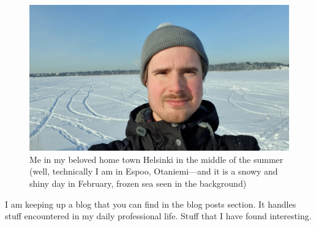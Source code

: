 \documentclass{article}
\begin{document}




        

        \begin{figure}
          \includegraphics[width=\linewidth]{me1.jpg}
          \caption{Me in my beloved home town Helsinki in the middle of the summer (well, technically I am in Espoo, Otaniemi---and it is a snowy and shiny day in February, frozen sea seen in the background)}
        \end{figure}

        
        I am keeping up a blog that you can find in the blog posts section. It handles stuff encountered in my daily professional life. Stuff that I have found interesting. 
        
\end{document}

